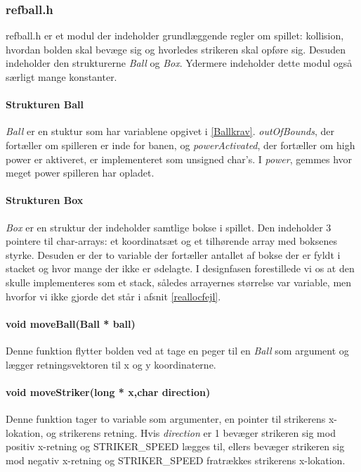 \subsubsection{refball.h}
refball.h er et modul der indeholder grundlæggende regler om spillet: kollision, hvordan bolden skal bevæge sig og hvorledes strikeren skal opføre sig. Desuden indeholder den strukturerne \textit{Ball} og \textit{Box}. Ydermere indeholder dette modul også særligt mange konstanter.
\paragraph{Strukturen Ball}
\textit{Ball} er en stuktur som har variablene opgivet i \ref{Ballkrav}. \textit{outOfBounds}, der fortæller om spilleren er inde for banen, og \textit{powerActivated}, der fortæller om high power er aktiveret, er implementeret som unsigned char's. I \textit{power}, gemmes hvor meget power spilleren har opladet.
 

\paragraph{Strukturen Box}
\textit{Box} er en struktur der indeholder samtlige bokse i spillet. Den indeholder 3 pointere til char-arrays: et koordinatsæt og et tilhørende array med boksenes styrke. Desuden er der to variable der fortæller antallet af bokse der er fyldt i stacket og hvor mange der ikke er ødelagte. I designfasen forestillede vi os at den skulle implementeres som et stack, således arrayernes størrelse var variable, men hvorfor vi ikke gjorde det står i afsnit \ref{reallocfejl}.
\paragraph{void moveBall(Ball * ball)}
Denne funktion flytter bolden ved at tage en peger til en \textit{Ball} som argument og lægger retningsvektoren til x og y koordinaterne.
\paragraph{void moveStriker(long * x,char direction)}
Denne funktion tager to variable som argumenter, en pointer til strikerens x-lokation, og  strikerens retning. Hvis \textit{direction} er 1 bevæger strikeren sig mod positiv x-retning og STRIKER\_SPEED lægges til, ellers bevæger strikeren sig mod negativ x-retning og STRIKER\_SPEED fratrækkes strikerens x-lokation.
